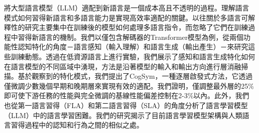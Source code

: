 將大型語言模型（LLM）適配到新語言是一個成本高且不透明的過程。理解語言模式如何習得新語言和多語言能力是實現高效率適配的關鍵。以往關於多語言可解釋性的研究主要集中在訓練後的模型如何處理多語言指令，而忽略了它們在訓練過程中習得新語言的機制。我們以僅包含解碼器的Transformer模型為例，從兩個功能性認知特化的角度－語言感知（輸入理解）和語言生成（輸出產生）－來研究這些訓練動態。透過在低資源語言上進行實驗，我們展示了感知和語言生成特化如何在語言模型的不同區域中湧現，方法是沿著模型的輸入和輸出方向進行層消融掃描。基於觀察到的特化模式，我們提出了CogSym，一種逐層啟發式方法，它透過僅微調少數幾個早期和晚期層來實現有效的適配。我們證明，僅調整最外層的25\%即可使下游任務的性能與完全微調的基線性能偏差控制在2-3\%以內。此外，我們也從第一語言習得（FLA）和第二語言習得（SLA）的角度分析了語言學習模型（LLM）中的語言學習困難。我們的研究揭示了目前語言學習模型架構與人類語言習得過程中的認知和行為之間的相似之處。

